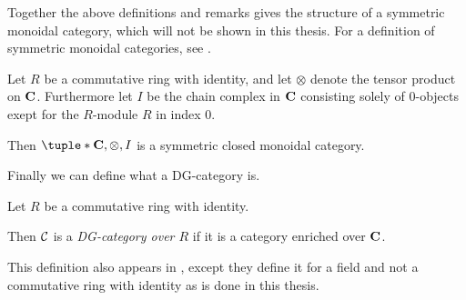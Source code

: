 Together the above definitions and remarks gives the structure of a symmetric monoidal category, which will not be shown in this thesis. For a definition of symmetric monoidal categories, see \cite[Definition 6.1.1]{Borceux_1994}.

\begin{fact}
    Let \( R \) be a commutative ring with identity, and let \( \otimes \) denote the tensor product on \( \operatorname{\mathbf{C}} \). Furthermore let \( I \) be the chain complex in \( \operatorname{\mathbf{C}} \) consisting solely of \( 0 \)-objects exept for the \( R \)-module \( R \) in index \( 0 \).

    Then \( \tuple*{\C, \otimes, I} \) is a symmetric closed monoidal category.
\end{fact}

Finally we can define what a DG-category is.

\begin{definition}[DG-category]
    \label{def:dg_cat}
    Let \( R \) be a commutative ring with identity.

    Then \( {\mathcal{C}} \) is a \emph{DG-category over \( R \)} if it is a category enriched over \( \operatorname{\mathbf{C}} \).
\end{definition}

This definition also appears in \cite[p. 29]{Jasso-Muro_2023}, except they define it for a field and not a commutative ring with identity as is done in this thesis.
